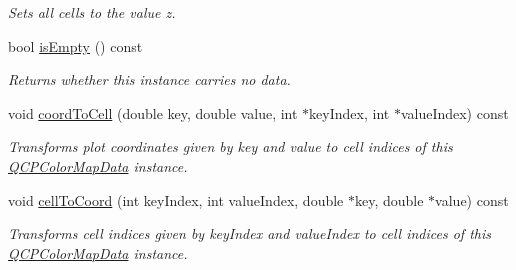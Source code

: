 \begin{DoxyCompactItemize}
\begin{DoxyCompactList}\small\item\em Sets all cells to the value {\itshape z}. \end{DoxyCompactList}\item 
bool \hyperlink{classQCPColorMapData_a986009324aee1fc5f696db46bd03dde5}{is\+Empty} () const 
\begin{DoxyCompactList}\small\item\em Returns whether this instance carries no data. \end{DoxyCompactList}\item 
void \hyperlink{classQCPColorMapData_a26e33c5ec7094b60136350bcd77d3737}{coord\+To\+Cell} (double key, double value, int $\ast$key\+Index, int $\ast$value\+Index) const 
\begin{DoxyCompactList}\small\item\em Transforms plot coordinates given by {\itshape key} and {\itshape value} to cell indices of this \hyperlink{classQCPColorMapData}{Q\+C\+P\+Color\+Map\+Data} instance. \end{DoxyCompactList}\item 
void \hyperlink{classQCPColorMapData_ac96d6e84befe7b9951b5da6d4d4a2a47}{cell\+To\+Coord} (int key\+Index, int value\+Index, double $\ast$key, double $\ast$value) const 
\begin{DoxyCompactList}\small\item\em Transforms cell indices given by {\itshape key\+Index} and {\itshape value\+Index} to cell indices of this \hyperlink{classQCPColorMapData}{Q\+C\+P\+Color\+Map\+Data} instance. \end{DoxyCompactList}\end{DoxyCompactItemize}
